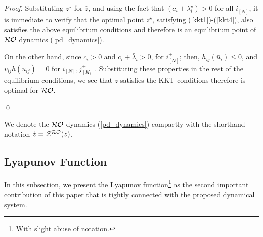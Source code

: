 \documentclass[journal,twoside,web]{ieeecolor}
\begin{document}
\begin{proof}
Substituting $z^\star$ for $\bar{z}$, and using the fact that $(c_i+\lambda_i^\star)>0$ for all $i^+_{[N]}$, it is immediate to verify that the optimal point $z^\star$, satisfying (\ref{kkt1})-(\ref{kkt4}), also satisfies the above equilibrium conditions and therefore is an equilibrium point of ${\cal RO}$ dynamics (\ref{pd_dynamics}).

On the other hand, since $c_i> 0$ and $c_i+\bar{\lambda}_i>0$,  for $i_{[N]}^+$; then, $h_{ij}(\bar{u}_i)\leq 0$, and $\bar{v}_{ij} h(\bar{u}_{ij})=0$ for $i_{[N]},j_{[K_i]}^+$. Substituting these properties in the rest of the equilibrium conditions, we see that $\bar{z}$ satisfies the KKT conditions therefore is optimal for ${\cal RO}$.

\qed
\end{proof}


We denote the ${\cal RO}$ dynamics (\ref{pd_dynamics}) compactly with the shorthand notation $\dot z={\cal Z}^{\cal RO}(z)$.

\subsection{Lyapunov Function}
In this subsection, we present the Lyapunov function\footnote{With slight abuse of notation.} as the second important contribution of this paper that is tightly connected with the proposed dynamical system.
\end{document}
